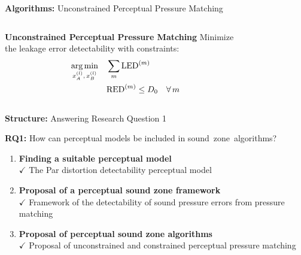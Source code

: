 \documentclass[aspectratio=169]{beamer}
\begin{document}
\begin{frame}{\textbf{Algorithms:} Unconstrained Perceptual Pressure Matching}
    \begin{columns}[c]
        \centering
        \begin{block}{\textbf{Unconstrained Perceptual Pressure Matching}}
            Minimize the leakage error detectability with constraints: 
            \begin{equation}
                \begin{aligned}
                    \operatorname*{arg\,min}_{x_A^{(l)},\,x_B^{(l)}}\quad &\sum_m \text{LED}^{(m)}\\
                    &\text{RED}^{(m)} \leq D_0 \quad\forall\,m
                \end{aligned}
            \end{equation}
        \end{block}
        \begin{figure}[]
            \centering
            \vspace{-13pt}
            \scalebox{0.6}{}
        \end{figure}
    \end{columns}
\end{frame}

\begin{frame}{\textbf{Structure:} Answering Research Question 1}
    \begin{block}{\textbf{RQ1:} How can perceptual models be included in sound~zone~algorithms?}
        \begin{enumerate}
            \item \textbf{Finding a suitable perceptual model}
                \\{{$\mathbf{\checkmark}$} The Par distortion detectability perceptual model}\vspace{3pt}
            \item \textbf{Proposal of a perceptual sound zone framework}
                \\{{$\mathbf{\checkmark}$} Framework of the detectability of sound pressure errors from pressure matching}\vspace{3pt}
            \item \textbf{Proposal of perceptual sound zone algorithms}
                \\{$\mathbf{\checkmark}$} Proposal of unconstrained and constrained perceptual pressure matching\vspace{3pt}
        \end{enumerate}
    \end{block}
\end{frame}
\end{document}
